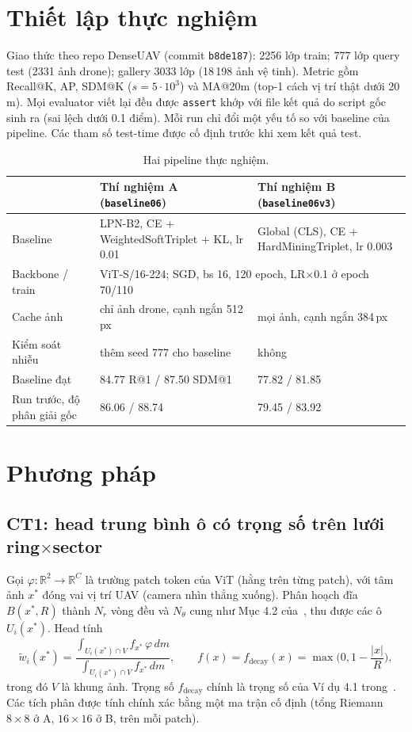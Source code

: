\documentclass[11pt,a4paper]{article}
\newcommand{\dd}{\,dm}
\begin{document}
\section{Thiết lập thực nghiệm}
Giao thức theo repo DenseUAV (commit \texttt{b8de187}): 2256 lớp train; 777 lớp query test (2331 ảnh drone); gallery 3033 lớp (18\,198 ảnh vệ tinh). Metric gồm Recall@K, AP, SDM@K ($s=5\cdot10^3$) và MA@20m (top-1 cách vị trí thật dưới 20\,m). Mọi evaluator viết lại đều được \texttt{assert} khớp với file kết quả do script gốc sinh ra (sai lệch dưới 0.1 điểm). Mỗi run chỉ đổi một yếu tố so với baseline của pipeline. Các tham số test-time được cố định trước khi xem kết quả test.

\begin{table}[h]\centering\small
\caption{Hai pipeline thực nghiệm.}\label{tab:setup}
\begin{tabular}{@{}lll@{}}\toprule
& Thí nghiệm A (\texttt{baseline06}) & Thí nghiệm B (\texttt{baseline06v3})\\\midrule
Baseline & LPN-B2, CE + WeightedSoftTriplet + KL, lr 0.01 & Global (CLS), CE + HardMiningTriplet, lr 0.003\\
Backbone / train & \multicolumn{2}{l}{ViT-S/16-224; SGD, bs 16, 120 epoch, LR$\times$0.1 ở epoch 70/110}\\
Cache ảnh & chỉ ảnh drone, cạnh ngắn 512\,px & mọi ảnh, cạnh ngắn 384\,px\\
Kiểm soát nhiễu & thêm seed 777 cho baseline & không\\
Baseline đạt & 84.77 R@1 / 87.50 SDM@1 & 77.82 / 81.85\\
Run trước, độ phân giải gốc & 86.06 / 88.74 & 79.45 / 83.92\\\bottomrule
\end{tabular}
\end{table}

\section{Phương pháp}
\subsection{CT1: head trung bình ô có trọng số trên lưới ring$\times$sector}
Gọi $\varphi:\mathbb R^2\to\mathbb R^C$ là trường patch token của ViT (hằng trên từng patch), với tâm ảnh $x^*$ đóng vai vị trí UAV (camera nhìn thẳng xuống). Phân hoạch đĩa $B(x^*,R)$ thành $N_r$ vòng đều và $N_\theta$ cung như Mục 4.2 của~\cite{huu2026}, thu được các ô $U_i(x^*)$. Head tính
\begin{equation}\label{eq:head}
\tilde w_i(x^*)=\frac{\displaystyle\int_{U_i(x^*)\cap V} f_{x^*}\,\varphi\dd}{\displaystyle\int_{U_i(x^*)\cap V} f_{x^*}\dd},\qquad
f(x)=f_{\mathrm{decay}}(x)=\max\!\Big(0,1-\frac{|x|}{R}\Big),
\end{equation}
trong đó $V$ là khung ảnh. Trọng số $f_{\mathrm{decay}}$ chính là trọng số của Ví dụ 4.1 trong~\cite{huu2026}. Các tích phân được tính chính xác bằng một ma trận cố định (tổng Riemann $8\times8$ ở A, $16\times16$ ở B, trên mỗi patch).
\end{document}
